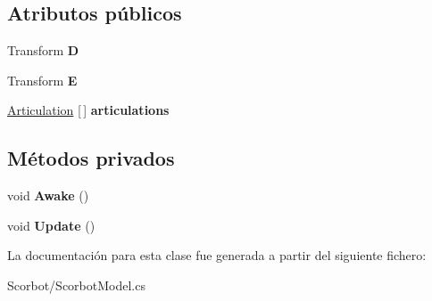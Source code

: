 \subsection*{Atributos públicos}
\begin{DoxyCompactItemize}
\item 
\mbox{\label{class_scorbot_model_a289b612c7d1813ad345f42432e7ba283}} 
Transform {\bfseries D}
\item 
\mbox{\label{class_scorbot_model_a2ba60afbee406ae079a8680b1836913b}} 
Transform {\bfseries E}
\item 
\mbox{\label{class_scorbot_model_a2c5605692707695fc2e4a260c5fbde03}} 
\mbox{\hyperlink{class_articulation}{Articulation}} \mbox{[}$\,$\mbox{]} {\bfseries articulations}
\end{DoxyCompactItemize}
\subsection*{Métodos privados}
\begin{DoxyCompactItemize}
\item 
\mbox{\label{class_scorbot_model_a8fe778901e324215e758a649ed963caa}} 
void {\bfseries Awake} ()
\item 
\mbox{\label{class_scorbot_model_a9a9e4bc6959d9734df0e2853db5bc5cd}} 
void {\bfseries Update} ()
\end{DoxyCompactItemize}


La documentación para esta clase fue generada a partir del siguiente fichero\+:\begin{DoxyCompactItemize}
\item 
Scorbot/Scorbot\+Model.\+cs\end{DoxyCompactItemize}
